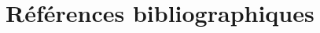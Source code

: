 \documentclass[11pt,pdflatex]{book}
\begin{document}




\begingroup\small
  \printindex[aut]
  \printindex
\endgroup
\nocite{*}
\chapter{Références bibliographiques}
\printbibliography[heading=bibempty]
\end{document}
